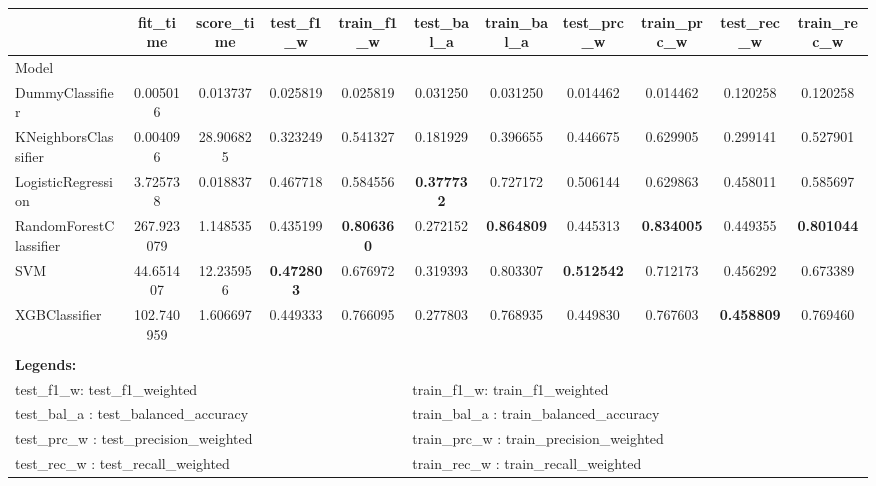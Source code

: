 \begin{tabular}{lcccccccccc}
\toprule
& fit\_time & score\_time & test\_f1\_w & train\_f1\_w & test\_bal\_a & train\_bal\_a & test\_prc\_w & train\_prc\_w & test\_rec\_w & train\_rec\_w \\ 
\midrule
Model &  &  &  &  &  &  &  &  &  &  \\
DummyClassifier & 0.005016 & 0.013737 & 0.025819 & 0.025819 & 0.031250 & 0.031250 & 0.014462 & 0.014462 & 0.120258 & 0.120258 \\
KNeighborsClassifier & 0.004096 & 28.906825 & 0.323249 & 0.541327 & 0.181929 & 0.396655 & 0.446675 & 0.629905 & 0.299141 & 0.527901 \\
\rowcolor{lightgray} LogisticRegression & 3.725738 & 0.018837 & 0.467718 & 0.584556 & \textbf{0.377732} & 0.727172 & 0.506144 & 0.629863 & 0.458011 & 0.585697 \\
RandomForestClassifier & 267.923079 & 1.148535 & 0.435199 & \textbf{0.806360} & 0.272152 & \textbf{0.864809} & 0.445313 & \textbf{0.834005} & 0.449355 & \textbf{0.801044} \\
SVM & 44.651407 & 12.235956 & \textbf{0.472803} & 0.676972 & 0.319393 & 0.803307 & \textbf{0.512542} & 0.712173 & 0.456292 & 0.673389 \\
XGBClassifier & 102.740959 & 1.606697 & 0.449333 & 0.766095 & 0.277803 & 0.768935 & 0.449830 & 0.767603 & \textbf{0.458809} & 0.769460 \\
\bottomrule
{} \\
\multicolumn{10}{l}{\textbf{Legends:}}   \\ \midrule
\multicolumn{5}{l}{test\_f1\_w: test\_f1\_weighted} & \multicolumn{5}{l}{train\_f1\_w: train\_f1\_weighted} \\
\multicolumn{5}{l}{test\_bal\_a : test\_balanced\_accuracy } & \multicolumn{5}{l}{train\_bal\_a : train\_balanced\_accuracy } \\
\multicolumn{5}{l}{test\_prc\_w : test\_precision\_weighted } & \multicolumn{5}{l}{train\_prc\_w : train\_precision\_weighted } \\
\multicolumn{5}{l}{test\_rec\_w : test\_recall\_weighted} & \multicolumn{5}{l}{train\_rec\_w : train\_recall\_weighted} \\
\end{tabular}
